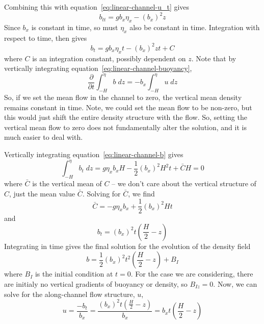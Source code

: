 \documentclass[11pt]{report}
\numberwithin{equation}{section}
\begin{document}
Combining this with equation~\ref{eq:linear-channel-u_t} gives
\begin{equation}
    b_{tt} = g b_x \eta_x - (b_x)^2 z
\end{equation}
Since $b_x$ is constant in time, so must $\eta_x$ also be constant in time.  Integration with respect to time, then gives
\begin{equation}
    \label{eq:linear-channel-b}
    b_t = g b_x \eta_x t - (b_x)^2 z t + C
\end{equation}
where $C$ is an integration constant, possibly dependent on $z$.  Note that by vertically integrating equation~\ref{eq:linear-channel-buoyancy},
\begin{equation}
    \frac{\partial}{\partial t} \int_{-H}^\eta b\;dz = - b_x \int_{-H}^\eta u\;dz
\end{equation}
So, if we set the mean flow in the channel to zero, the vertical mean density remains constant in time.  Note, we could set the mean flow to be non-zero, but this would just shift the entire density structure with the flow.  So, setting the vertical mean flow to zero does not fundamentally alter the solution, and it is much easier to deal with.

Vertically integrating equation~\ref{eq:linear-channel-b} gives
\begin{equation}
    \int_{-H}^\eta b_t\;dz = g \eta_x b_x H - \frac{1}{2}(b_x)^2 H^2 t + \bar{C} H = 0
\end{equation}
where $\bar{C}$ is the vertical mean of $C$ -- we don't care about the vertical structure of $C$, just the mean value $\bar{C}$.  Solving for $\bar{C}$, we find
\begin{equation}
    \bar{C} = -g \eta_x b_x + \frac{1}{2} (b_x)^2 H t
\end{equation}
and
\begin{equation}
    b_t = (b_x)^2 t \left( \frac{H}{2} - z \right)
\end{equation}
Integrating in time gives the final solution for the evolution of the density field
\begin{equation}
    b = \frac{1}{2}(b_x)^2 t^2 \left( \frac{H}{2} - z \right) + B_I
\end{equation}
where $B_I$ is the initial condition at $t=0$.  For the case we are considering, there are initialy no vertical gradients of buoyancy or density, so $B_{Iz} = 0$.  Now, we can solve for the along-channel flow structure, $u$,
\begin{equation}
    u = \frac{-b_t}{b_x} = \frac{(b_x)^2 t \left( \frac{H}{2} - z \right)}{b_x}
         = b_x t \left( \frac{H}{2} - z \right)
\end{equation}
\end{document}
